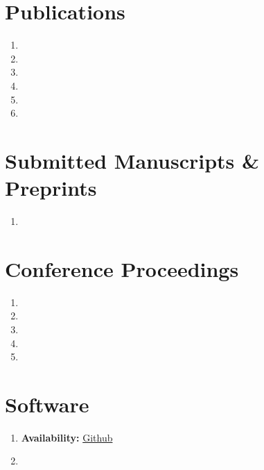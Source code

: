 \documentclass[margin,centered]{res}
\begin{document}
\begin{resume}
\section{\sc Publications}
\begin{enumerate}[leftmargin=*]
\item {}
\item {}
\item {}
\item {}
\item {}
\item {}
\end{enumerate}

\section{\sc Submitted Manuscripts \& Preprints}

\begin{enumerate}[leftmargin=*]
\item {}
\end{enumerate}



\section{\sc Conference Proceedings}
\begin{enumerate}[leftmargin=*]
\item {}
\item {}
\item {}
\item {}
\item {}
\end{enumerate}


\section{\sc Software} 
\begin{enumerate}[leftmargin=*]
\item {}

\textbf{Availability:}
\href{https://github.com/bryandmartin/corncob}{Github}
    \item {}
    

\end{enumerate}
\end{resume}
\end{document}
